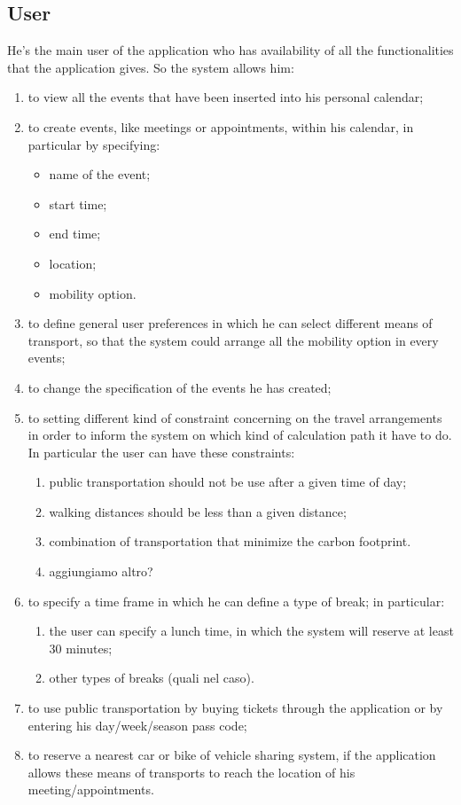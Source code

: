 \subsection*{User}
He's the main user of the application who has availability of all the functionalities that the application gives. So the system allows him:
\begin{enumerate}[resume]
	\item to view all the events that have been inserted into his personal calendar;
	\item to create events, like meetings or appointments, within his calendar, in particular by specifying: 
	\begin{itemize}
		\item name of the event;
		\item start time;
		\item end time;
		\item location;
		\item mobility option.
	\end{itemize}
	\item to define general user preferences in which he can select different means of transport, so that the system could arrange all the mobility option in every 			events;
	\item to change the specification of the events he has created;
	\item to setting different kind of constraint concerning on the travel arrangements in order to inform the system on which kind of calculation path it have to do. In 			particular the user can have these constraints:
	\begin{enumerate}[label*=\arabic*.]
		\item public transportation should not be use after a given time of day;
		\item walking distances should be less than a given distance;
		\item combination of transportation that minimize the carbon footprint.
		\item aggiungiamo altro?
	\end{enumerate}
	\item to specify a time frame in which he can define a type of break; in particular:
	\begin{enumerate}[label*=\arabic*.]
		\item the user can specify a lunch time, in which the system will reserve at least 30 minutes;
		\item other types of breaks (quali nel caso).
	\end{enumerate}
	\item to use public transportation by buying tickets through the application or by entering his day/week/season pass code;
	\item to reserve a nearest car or bike of vehicle sharing system, if the application allows these means of transports to reach the location of his meeting/appointments.
\end{enumerate}





